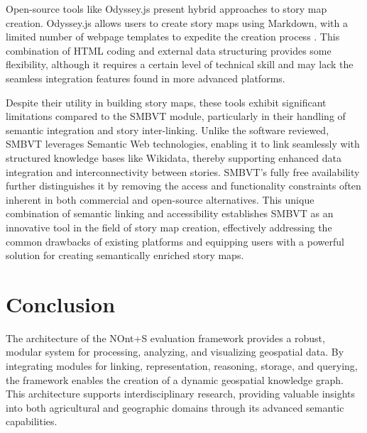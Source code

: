 Open-source tools like Odyssey.js present hybrid approaches to story map creation. Odyssey.js allows users to create story maps using Markdown, with a limited number of webpage templates to expedite the creation process \cite{Odysseyjs}. This combination of HTML coding and external data structuring provides some flexibility, although it requires a certain level of technical skill and may lack the seamless integration features found in more advanced platforms.

Despite their utility in building story maps, these tools exhibit significant limitations compared to the SMBVT module, particularly in their handling of semantic integration and story inter-linking. Unlike the software reviewed, SMBVT leverages Semantic Web technologies, enabling it to link seamlessly with structured knowledge bases like Wikidata, thereby supporting enhanced data integration and interconnectivity between stories. SMBVT’s fully free availability further distinguishes it by removing the access and functionality constraints often inherent in both commercial and open-source alternatives. This unique combination of semantic linking and accessibility establishes SMBVT as an innovative tool in the field of story map creation, effectively addressing the common drawbacks of existing platforms and equipping users with a powerful solution for creating semantically enriched story maps.






\section{Conclusion}

The architecture of the NOnt+S evaluation framework provides a robust, modular system for processing, analyzing, and visualizing geospatial data. By integrating modules for linking, representation, reasoning, storage, and querying, the framework enables the creation of a dynamic geospatial knowledge graph. This architecture supports interdisciplinary research, providing valuable insights into both agricultural and geographic domains through its advanced semantic capabilities.
